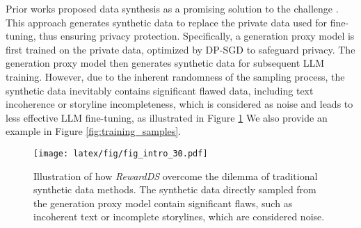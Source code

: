 Prior works proposed data synthesis as a promising solution to the challenge \citep{yue-etal-2023-synthetic, Kurakin2023HarnessingLM, yu2023training, mattern-etal-2022-differentially, Flemings2024DifferentiallyPK}. 
This approach generates synthetic data to replace the private data used for fine-tuning, thus ensuring privacy protection. 
Specifically, a generation proxy model is first trained on the private data, optimized by DP-SGD \citep{Abadi2016DeepLDP} to safeguard privacy. 
The generation proxy model then generates synthetic data for subsequent LLM training.
However, due to the inherent randomness of the sampling process, the synthetic data inevitably contains significant flawed data, including text incoherence or storyline incompleteness, which is considered as noise and leads to less effective LLM fine-tuning, as illustrated in Figure \ref{fig:fig_intro} 
We also provide an example in Figure \ref{fig:training_samples}.


\begin{figure}[t]
\centering
\texttt{[image: latex/fig/fig\_intro\_30.pdf]}
\vspace{-15pt}
\caption{
Illustration of how \textit{RewardDS} overcome the dilemma of traditional synthetic data methods.
The synthetic data directly sampled from the generation proxy model contain significant flaws, such as incoherent text or incomplete storylines, which are considered noise.
}
\vspace{-1.5em}
\label{fig:fig_intro}
\end{figure}


